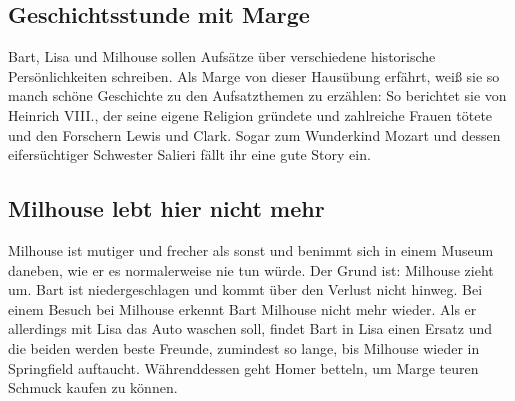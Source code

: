 \subsection{Geschichtsstunde mit Marge}
Bart, Lisa und Milhouse sollen Aufsätze über verschiedene historische Per\-sön\-lich\-kei\-ten schreiben. Als Marge von dieser Hausübung erfährt, weiß sie so manch schöne Geschichte zu den Aufsatzthemen zu erzählen: So berichtet sie von Heinrich VIII., der seine eigene Religion gründete und zahlreiche Frauen tötete und den Forschern Lewis und Clark. Sogar zum Wunderkind Mozart und dessen eifersüchtiger Schwester Salieri fällt ihr eine gute Story ein.


\subsection{Milhouse lebt hier nicht mehr}\label{FABF07}
Milhouse ist mutiger und frecher als sonst und benimmt sich in einem Museum daneben, wie er es normalerweise nie tun würde. Der Grund ist: Milhouse zieht um. Bart ist niedergeschlagen und kommt über den Verlust nicht hinweg. Bei einem Besuch bei Milhouse erkennt Bart Milhouse nicht mehr wieder. Als er allerdings mit Lisa das Auto waschen soll, findet Bart in Lisa einen Ersatz und die beiden werden beste Freunde, zumindest so lange, bis Milhouse wieder in Springfield auftaucht. Währenddessen geht Homer betteln, um Marge teuren Schmuck kaufen zu können.

